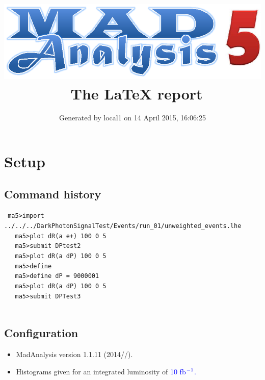 \documentclass[a4paper, 11pt]{article}
\title{{\includegraphics[scale=.4]{logo.eps}}\ The LaTeX report}
\author{Generated by local1 on 14 April 2015, 16:06:25}
\begin{document}
\maketitle
\flushbottom

\newpage
\section{ Setup}

\subsection{ Command history}

\texttt{ ma5>import ../\-../\-../\-DarkPhotonSignalTest/\-Events/\-run\_01/\-unweighted\_events.lhe\\
}
\texttt{ }\texttt{ }\texttt{ ma5>plot dR(a e+) 100 0 5\\
}
\texttt{ }\texttt{ }\texttt{ ma5>submit DPtest2\\
}
\texttt{ }\texttt{ }\texttt{ ma5>plot dR(a dP) 100 0 5\\
}
\texttt{ }\texttt{ }\texttt{ ma5>define \\
}
\texttt{ }\texttt{ }\texttt{ ma5>define dP = 9000001\\
}
\texttt{ }\texttt{ }\texttt{ ma5>plot dR(a dP) 100 0 5\\
}
\texttt{ }\texttt{ }\texttt{ ma5>submit DPTest3\\
}
\texttt{ }\texttt{ }\subsection{ Configuration}

\begin{itemize}
  \item MadAnalysis version 1.1.11 (2014//).
   \item Histograms given for an integrated luminosity of \textcolor{blue}{10}\textcolor{blue}{ fb}$^{\textcolor{blue}{-1}}$\textcolor{blue}{.}
\textcolor{blue}{}
\end{itemize}
\newpage
\end{document}
